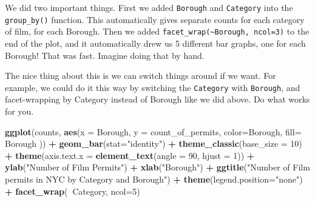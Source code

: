\documentclass[]{book}
\newenvironment{Shaded}{\begin{snugshade}}{\end{snugshade}}
\newcommand{\KeywordTok}[1]{\textcolor[rgb]{0.13,0.29,0.53}{\textbf{#1}}}
\newcommand{\DataTypeTok}[1]{\textcolor[rgb]{0.13,0.29,0.53}{#1}}
\newcommand{\DecValTok}[1]{\textcolor[rgb]{0.00,0.00,0.81}{#1}}
\newcommand{\StringTok}[1]{\textcolor[rgb]{0.31,0.60,0.02}{#1}}
\newcommand{\OperatorTok}[1]{\textcolor[rgb]{0.81,0.36,0.00}{\textbf{#1}}}
\newcommand{\NormalTok}[1]{#1}
\begin{document}
We did two important things. First we added \texttt{Borough} and
\texttt{Category} into the \texttt{group\_by()} function. This
automatically gives separate counts for each category of film, for each
Borough. Then we added
\texttt{facet\_wrap(\textasciitilde{}Borough,\ ncol=3)} to the end of
the plot, and it automatically drew us 5 different bar graphs, one for
each Borough! That was fast. Imagine doing that by hand.

The nice thing about this is we can switch things around if we want. For
example, we could do it this way by switching the \texttt{Category} with
\texttt{Borough}, and facet-wrapping by Category instead of Borough like
we did above. Do what works for you.

\begin{Shaded}
\begin{Highlighting}[]
\KeywordTok{ggplot}\NormalTok{(counts, }\KeywordTok{aes}\NormalTok{(}\DataTypeTok{x =}\NormalTok{ Borough, }\DataTypeTok{y =}\NormalTok{ count_of_permits, }
                   \DataTypeTok{color=}\NormalTok{Borough, }
                   \DataTypeTok{fill=}\NormalTok{ Borough )) }\OperatorTok{+}
\StringTok{  }\KeywordTok{geom_bar}\NormalTok{(}\DataTypeTok{stat=}\StringTok{"identity"}\NormalTok{) }\OperatorTok{+}\StringTok{ }
\StringTok{  }\KeywordTok{theme_classic}\NormalTok{(}\DataTypeTok{base_size =} \DecValTok{10}\NormalTok{) }\OperatorTok{+}
\StringTok{  }\KeywordTok{theme}\NormalTok{(}\DataTypeTok{axis.text.x =} \KeywordTok{element_text}\NormalTok{(}\DataTypeTok{angle =} \DecValTok{90}\NormalTok{, }\DataTypeTok{hjust =} \DecValTok{1}\NormalTok{)) }\OperatorTok{+}
\StringTok{  }\KeywordTok{ylab}\NormalTok{(}\StringTok{"Number of Film Permits"}\NormalTok{) }\OperatorTok{+}\StringTok{ }
\StringTok{  }\KeywordTok{xlab}\NormalTok{(}\StringTok{"Borough"}\NormalTok{) }\OperatorTok{+}
\StringTok{  }\KeywordTok{ggtitle}\NormalTok{(}\StringTok{"Number of Film permits in NYC by Category and Borough"}\NormalTok{) }\OperatorTok{+}
\StringTok{  }\KeywordTok{theme}\NormalTok{(}\DataTypeTok{legend.position=}\StringTok{"none"}\NormalTok{) }\OperatorTok{+}
\StringTok{  }\KeywordTok{facet_wrap}\NormalTok{(}\OperatorTok{~}\NormalTok{Category, }\DataTypeTok{ncol=}\DecValTok{5}\NormalTok{)}
\end{Highlighting}
\end{Shaded}
\end{document}
